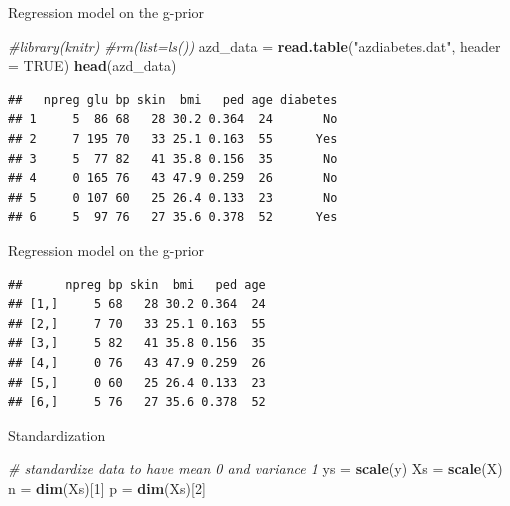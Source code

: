 \documentclass[ignorenonframetext,]{beamer}
\newenvironment{Shaded}{\begin{snugshade}}{\end{snugshade}}
\newcommand{\KeywordTok}[1]{\textcolor[rgb]{0.13,0.29,0.53}{\textbf{#1}}}
\newcommand{\DataTypeTok}[1]{\textcolor[rgb]{0.13,0.29,0.53}{#1}}
\newcommand{\DecValTok}[1]{\textcolor[rgb]{0.00,0.00,0.81}{#1}}
\newcommand{\StringTok}[1]{\textcolor[rgb]{0.31,0.60,0.02}{#1}}
\newcommand{\CommentTok}[1]{\textcolor[rgb]{0.56,0.35,0.01}{\textit{#1}}}
\newcommand{\OtherTok}[1]{\textcolor[rgb]{0.56,0.35,0.01}{#1}}
\newcommand{\OperatorTok}[1]{\textcolor[rgb]{0.81,0.36,0.00}{\textbf{#1}}}
\newcommand{\NormalTok}[1]{#1}
\begin{document}
\begin{frame}[fragile]{Regression model on the g-prior}

\begin{Shaded}
\begin{Highlighting}[]
\CommentTok{#library(knitr)}
\CommentTok{#rm(list=ls())}
\NormalTok{azd_data =}\StringTok{ }\KeywordTok{read.table}\NormalTok{(}\StringTok{"azdiabetes.dat"}\NormalTok{, }\DataTypeTok{header =} \OtherTok{TRUE}\NormalTok{)}
\KeywordTok{head}\NormalTok{(azd_data)}
\end{Highlighting}
\end{Shaded}

\begin{verbatim}
##   npreg glu bp skin  bmi   ped age diabetes
## 1     5  86 68   28 30.2 0.364  24       No
## 2     7 195 70   33 25.1 0.163  55      Yes
## 3     5  77 82   41 35.8 0.156  35       No
## 4     0 165 76   43 47.9 0.259  26       No
## 5     0 107 60   25 26.4 0.133  23       No
## 6     5  97 76   27 35.6 0.378  52      Yes
\end{verbatim}

\end{frame}

\begin{frame}[fragile]{Regression model on the g-prior}

\begin{Shaded}
\end{Shaded}

\begin{verbatim}
##      npreg bp skin  bmi   ped age
## [1,]     5 68   28 30.2 0.364  24
## [2,]     7 70   33 25.1 0.163  55
## [3,]     5 82   41 35.8 0.156  35
## [4,]     0 76   43 47.9 0.259  26
## [5,]     0 60   25 26.4 0.133  23
## [6,]     5 76   27 35.6 0.378  52
\end{verbatim}

\end{frame}

\begin{frame}[fragile]{Standardization}

\begin{Shaded}
\begin{Highlighting}[]
\CommentTok{# standardize data to have mean 0 and variance 1}
\NormalTok{ys =}\StringTok{ }\KeywordTok{scale}\NormalTok{(y)}
\NormalTok{Xs =}\StringTok{ }\KeywordTok{scale}\NormalTok{(X)}
\NormalTok{n =}\StringTok{ }\KeywordTok{dim}\NormalTok{(Xs)[}\DecValTok{1}\NormalTok{]}
\NormalTok{p =}\StringTok{ }\KeywordTok{dim}\NormalTok{(Xs)[}\DecValTok{2}\NormalTok{]}
\end{Highlighting}
\end{Shaded}

\end{frame}
\end{document}
